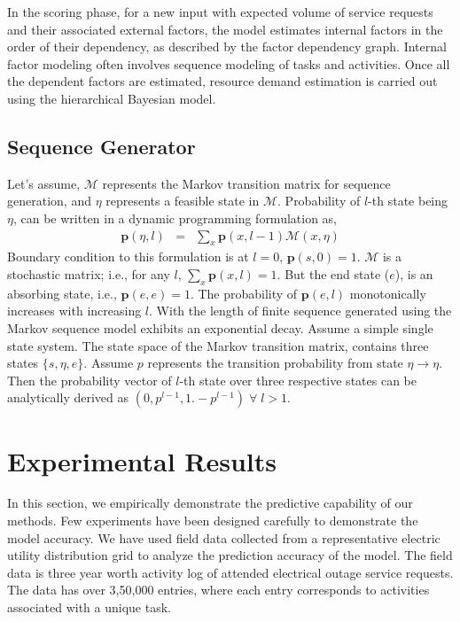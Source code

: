\documentclass[twoside,leqno,twocolumn]{article}
\begin{document}
In the scoring phase, for a new input with expected volume of service requests and their associated external factors, the model estimates internal factors in the order of their dependency, as described by the factor dependency graph.  Internal factor modeling often involves sequence modeling of tasks and activities. Once all the dependent factors are estimated, resource demand estimation is carried out using the hierarchical Bayesian model. 

\subsection{Sequence Generator}
\label{subsec:generator}
Let's assume, $\mathcal{M}$ represents the Markov transition matrix for sequence generation, and $\eta$ represents a feasible state in $\mathcal{M}$. Probability of $l$-th state being $\eta$, can be written in a dynamic programming formulation as,
\begin{eqnarray*}
\mathbf{p}(\eta,l) & = & \sum_{x}{\mathbf{p}(x,l-1)\mathcal{M}(x,\eta) } 
\end{eqnarray*}
Boundary condition to this formulation is at $l=0$, $\mathbf{p}(s,0) = 1$. $\mathcal{M}$ is a stochastic matrix; i.e., for any $l$, $\sum_{x}{\mathbf{p}(x,l)} = 1$. But the end state ($e$), is an absorbing state, i.e., $\mathbf{p}(e,e) = 1$. The probability of $\mathbf{p}(e,l)$ monotonically increases with increasing $l$. With the length of finite sequence generated using the Markov sequence model exhibits an exponential decay. Assume a simple single state system. The state space of the Markov transition matrix, contains three states $\lbrace s, \eta, e \rbrace$. Assume $p$ represents the transition probability from state $\eta \rightarrow \eta$. Then the probability vector of $l$-th state over three respective states can be analytically derived as $( 0, p^{l-1}, 1. - p^{l-1})\; \forall\; l > 1$.    

\section{Experimental Results}
In this section, we empirically demonstrate the predictive capability of our methods. Few experiments have been designed carefully to demonstrate the model accuracy. We have used field data collected from a representative electric utility distribution grid to analyze the prediction accuracy of the model. The field data is three year worth activity log of attended electrical outage service requests. The data has over 3,50,000 entries, where each entry corresponds to activities associated with a unique task. 
\end{document}
